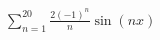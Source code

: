 \documentclass[preview]{standalone}
\begin{document}
\begin{center}
$\sum_{n=1}^{20} \frac{2(-1)^n}{n} \sin(nx)$
\end{center}
\end{document}
